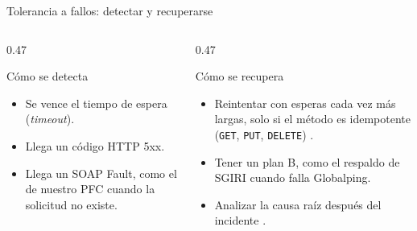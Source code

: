 \begin{frame}{Tolerancia a fallos: detectar y recuperarse}
\begin{columns}[T]
\begin{column}{0.47\textwidth}
\begin{block}{Cómo se detecta}
\begin{itemize}
\item Se vence el tiempo de espera (\emph{timeout}).
\item Llega un código HTTP 5xx.
\item Llega un SOAP Fault, como el de nuestro PFC cuando la solicitud no existe.
\end{itemize}
\end{block}
\end{column}
\begin{column}{0.47\textwidth}
\begin{block}{Cómo se recupera}
\begin{itemize}
\item Reintentar con esperas cada vez más largas, \alert{solo} si el método es idempotente (\texttt{GET}, \texttt{PUT}, \texttt{DELETE}) \cite{rfc9110}.
\item Tener un plan B, como el respaldo de SGIRI cuando falla Globalping.
\item Analizar la causa raíz después del incidente \cite{soldani2023}.
\end{itemize}
\end{block}
\end{column}
\end{columns}
\end{frame}

